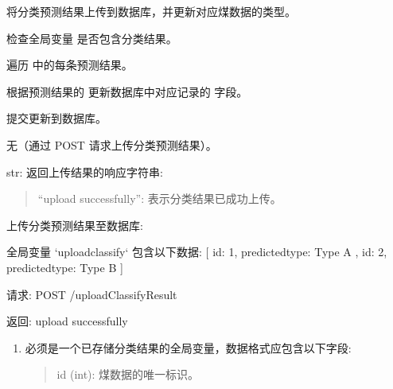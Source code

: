 \documentclass[a4paper,12pt,english]{sphinxmanual}
\begin{document}
\begin{fulllineitems}
\label{\detokenize{api/login:login.uploadClassifyResult}}
\pysigstartsignatures
{}
\pysigstopsignatures
\sphinxAtStartPar
将分类预测结果上传到数据库，并更新对应煤数据的类型。
\begin{description}
\sphinxAtStartPar
检查全局变量  是否包含分类结果。

\sphinxAtStartPar
遍历  中的每条预测结果。

\sphinxAtStartPar
根据预测结果的  更新数据库中对应记录的  字段。

\sphinxAtStartPar
提交更新到数据库。

\sphinxAtStartPar
无（通过 POST 请求上传分类预测结果）。

\sphinxAtStartPar
str: 返回上传结果的响应字符串:
\begin{quote}

\sphinxAtStartPar
“upload successfully”: 表示分类结果已成功上传。
\end{quote}

\sphinxAtStartPar
上传分类预测结果至数据库:

\begin{sphinxVerbatim}[commandchars=\\\{\}]
全局变量 `upload\PYGZus{}classify` 包含以下数据:
[
    \PYGZob{}
        \PYGZdq{}id\PYGZdq{}: 1,
        \PYGZdq{}predicted\PYGZus{}type\PYGZdq{}: \PYGZdq{}Type A\PYGZdq{}
    \PYGZcb{},
    \PYGZob{}
        \PYGZdq{}id\PYGZdq{}: 2,
        \PYGZdq{}predicted\PYGZus{}type\PYGZdq{}: \PYGZdq{}Type B\PYGZdq{}
    \PYGZcb{}
]

请求:
POST /uploadClassifyResult

返回:
\PYGZdq{}upload successfully\PYGZdq{}
\end{sphinxVerbatim}

\begin{enumerate}
%
\item {} 
\sphinxAtStartPar
{} 必须是一个已存储分类结果的全局变量，数据格式应包含以下字段:
\begin{quote}

\sphinxAtStartPar
id (int): 煤数据的唯一标识。


\end{quote}
\end{enumerate}
\end{description}
\end{fulllineitems}
\end{document}
